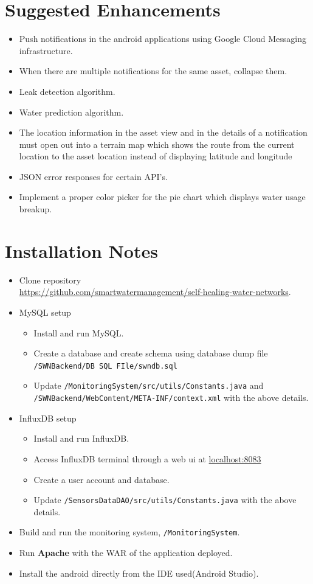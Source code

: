 \documentclass[11pt]{report} %
\begin{document}
\chapter{Suggested Enhancements}
\begin{itemize}
\item Push notifications in the android applications using Google Cloud Messaging infrastructure.
\item When there are multiple notifications for the same asset, collapse them.
\item Leak detection algorithm.
\item Water prediction algorithm.
\item The location information in the asset view and in the details of a notification must open out into a terrain map which shows the route from the current location to the asset location instead of displaying latitude and longitude
\item JSON error responses for certain API's.
\item Implement a proper color picker for the pie chart which displays water usage breakup.
\end{itemize}


\chapter{Installation Notes}
\begin{itemize}
\item Clone repository \\ \url {https://github.com/smartwatermanagement/self-healing-water-networks}.
\item MySQL setup
\begin{itemize}
\item Install and run MySQL. 
\item Create a database and create schema using database dump file  \texttt{/SWNBackend/DB SQL FIle/swndb.sql}
\item Update \texttt{/MonitoringSystem/src/utils/Constants.java} and \\ \texttt{/SWNBackend/WebContent/META-INF/context.xml} with the above details.
\end{itemize}
\item InfluxDB setup
\begin{itemize}
\item Install and run InfluxDB.
\item Access InfluxDB terminal through a web ui at \url {localhost:8083}
\item Create a user account and database.
\item Update \texttt{/SensorsDataDAO/src/utils/Constants.java} with the above details.
\end{itemize}
\item Build and run the monitoring system, \texttt{/MonitoringSystem}.
\item Run \textbf{Apache} with the WAR of the application deployed.
\item Install the android directly from the IDE used(Android Studio).
\end{itemize}
\end{document}
